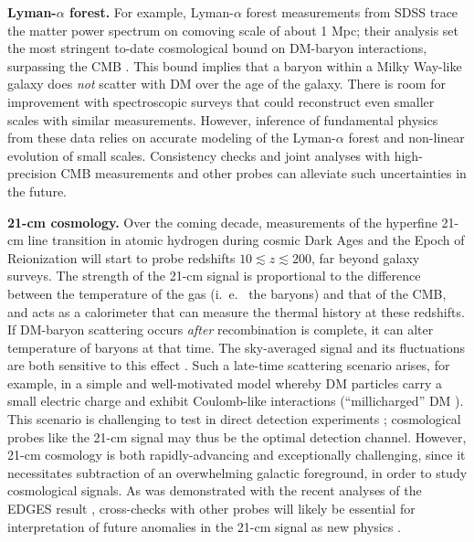 \documentclass[12pt]{article}
\begin{document}
\textbf{Lyman-$\alpha$ forest.} 
For example, Lyman-$\alpha$ forest measurements from SDSS trace the matter power spectrum on comoving scale of about 1 Mpc; their analysis set the most stringent to-date cosmological bound on DM-baryon interactions, surpassing the CMB  \cite{Xu:2018efh,Dvorkin:2013cga}.
This bound implies that a baryon within a Milky Way-like galaxy does \textit{not} scatter with DM over the age of the galaxy.
There is room for improvement with spectroscopic surveys that could reconstruct even smaller scales with similar measurements.
However, inference of fundamental physics from these data relies on accurate modeling of the Lyman-$\alpha$ forest and non-linear evolution of small scales.
Consistency checks and joint analyses with high-precision CMB measurements and other probes can alleviate such uncertainties in the future.

\textbf{21-cm cosmology.} 
Over the coming decade, measurements of the hyperfine 21-cm line transition in atomic hydrogen during cosmic Dark Ages and the Epoch of Reionization will start to probe redshifts $10 \lesssim z \lesssim 200$, far beyond galaxy surveys.
The strength of the 21-cm signal is proportional to the difference between the temperature of the gas (i.~e.~ the baryons) and that of the CMB, and acts as a calorimeter that can measure the thermal history at these redshifts.
If DM-baryon scattering occurs \textit{after} recombination is complete, it can alter temperature of baryons at that time. 
The sky-averaged signal and its fluctuations are both sensitive to this effect \cite{Munoz_15, Barkana_18, Fialkov_18, Munoz_18,2018arXiv180210094M}.
Such a late-time scattering scenario arises, for example, in a simple and well-motivated model whereby DM particles carry a small electric charge and exhibit Coulomb-like interactions (``millicharged'' DM \cite{2017arXiv170704591B,2019arXiv190208623D}).
This scenario is challenging to test in direct detection experiments \cite{2011PhRvD..83f3509M}; cosmological probes like the 21-cm signal may thus be the optimal detection channel.
However, 21-cm cosmology is both rapidly-advancing and exceptionally challenging, since it necessitates subtraction of an overwhelming galactic foreground, in order to study cosmological signals. 
As was demonstrated with the recent analyses of the EDGES result \cite{Bowman_18}, cross-checks with other probes will likely be essential for interpretation of future anomalies in the 21-cm signal as new physics \cite{Barkana:2018lgd,Kovetz:2018zan,Berlin:2018sjs}. 
\end{document}
